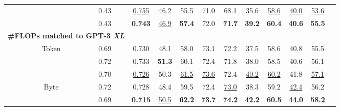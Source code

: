 \documentclass{article}
\newcommand{\model}{H-Net}
\newcommand{\twostage}{2-stage}
\newcommand{\onestage}{1-stage}
\newcommand{\best}[1]{\textbf{#1}}
\newcommand{\second}[1]{\underline{#1}}
\theoremstyle{plain}
\theoremstyle{remark}
\begin{document}
\begin{table}[t!]
{\begin{tabular}{lcccccccccccc}
\cellcolor{Orange7!10}{\model{} (\onestage{})} & & 0.43 & \second{0.755} & 46.2 & 55.5 & 71.0 & 68.1 & 35.6 & \second{58.6} & \second{40.0} & \second{53.6}\\
\cellcolor{Red7!10}{\model{} (\twostage{})} & & 0.43 & \best{0.743} & \second{46.9} & \best{57.4} & 72.0 & \best{71.7} & \best{39.2} & \best{60.4} & \best{40.6} & \best{55.5} \\
\midrule
\multicolumn{3}{l}{\quad \textbf{\#FLOPs matched to GPT-3 \textit{XL}}}\\
\cellcolor{Gray7!20}{Transformer} & Token & 0.69 & 0.730 & 48.1 & 58.0 & 73.1 & 72.2 & 37.5 & 58.6 & 40.8 & 55.5 \\
\addlinespace[-0.15em]
\cmidrule{1-12}
\addlinespace[-0.25em]
\cellcolor{Cyan7!10}{SpaceByte++} & & 0.72 & 0.733 & \best{51.3} & 60.1 & 72.4 & 71.8 & 38.0 & 58.5 & 40.6 & 56.1\\
\cellcolor{Green7!10}{H-Net (space)} & & 0.70 & \second{0.726} & 50.3 & \second{61.5} & \second{73.6} & 72.4 & \second{40.2} & \second{60.2} & 41.8 & \second{57.1} \\
\cellcolor{Orange7!10}{\model{} (\onestage{})} & \multirow{-2}{*}{Byte} & 0.72 & 0.728 & 48.4 & 59.5 & 72.4 & \second{73.0} & 38.3 & 59.2 & \second{42.4} & 56.2 \\
\cellcolor{Red7!10}{\model{} (\twostage{})} & & 0.69 & \best{0.715} & \second{50.5} & \best{62.2} & \best{73.7} & \best{74.2} & \best{42.2} & \best{60.5} & \best{44.0} & \best{58.2} \\
\bottomrule
\end{tabular}
} 
\label{tab: main}
\end{table}
\end{document}
